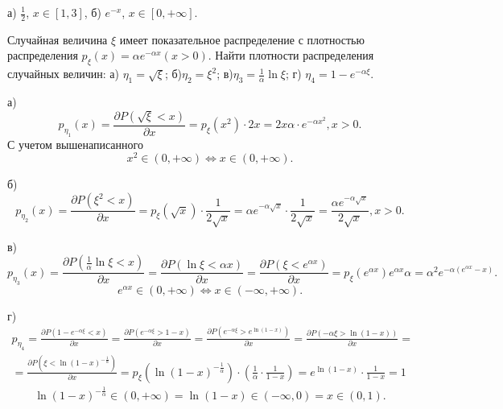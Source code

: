 \begin{solution}
  а) $\frac{1}{2}$, $x \in [1, 3]$, б) $e^{-x}$, $x \in [0, +\infty]$.
\end{solution}

\medskip
\begin{task}{3}
  Случайная величина $\xi$ имеет показательное распределение с плотностью распределения $p_\xi(x) = 
  \alpha e^{-\alpha x} (x > 0)$. Найти плотности распределения случайных величин: а) $\eta_1 = \sqrt{\xi}$;
  б)$\eta_2 = \xi^2$; в)$\eta_3 = \frac{1}{\alpha}\ln\xi$; г) $\eta_4 = 1 - e^{-\alpha\xi}$. 
\end{task}

\begin{subtask}{а)}
\[
p_{\eta_1}(x) = \frac{\partial P(\sqrt{\xi} < x)}{\partial x} = p_\xi(x^2) \cdot 2x = 
2x \alpha \cdot  e^{-\alpha x^2}, x > 0
.\] С учетом вышенаписанного 
\[
  x^2 \in (0, +\infty) \Longleftrightarrow x \in (0, +\infty)
.\] 
\end{subtask}

\begin{subtask}{б)}
\[
p_{\eta_2}(x) = \frac{\partial P(\xi^2 < x)}{\partial x} = p_\xi(\sqrt{x}) \cdot \frac{1}{2 \sqrt{x}
} = \alpha e^{-\alpha\sqrt{x} } \cdot  \frac{1}{2\sqrt{x} } = \frac{\alpha e^{-\alpha\sqrt{x}
}}{2\sqrt{x} }, x > 0
.\] 
\end{subtask}

\begin{subtask}{в)}
\[
  p_{\eta_3}(x) = \frac{\partial P(\frac{1}{\alpha}\ln\xi< x)}{\partial x} = \frac{\partial P(\ln\xi
  < \alpha x)}{\partial x} = \frac{\partial P(\xi < e^{\alpha x})}{\partial x} = p_\xi(e^{\alpha x})
  e^{\alpha x} \alpha = \alpha^2 e^{-\alpha(e^{\alpha x} - x)}
.\] 
\[
  e^{\alpha x} \in (0, +\infty) \Longleftrightarrow x \in (-\infty, +\infty)
.\] 
\end{subtask}

\begin{subtask}{г)}
\begin{align*}
p_{\eta_4} = \frac{\partial P(1 - e^{-\alpha \xi} < x)}{\partial x} = \frac{\partial P(e^{-\alpha\xi
}> 1 - x)}{\partial x} = \frac{\partial P(e^{-\alpha \xi} > e^{\ln(1 - x)})}{\partial x} = 
\frac{\partial P(-\alpha \xi > \ln(1 - x))}{\partial x} = \\ = \frac{\partial P(\xi < \ln(1 -
x)^{-\frac{1}{\alpha}})}{\partial x} = p_\xi(\ln(1 - x)^{- \frac{1}{\alpha}}) \cdot
(\frac{1}{\alpha} \cdot \frac{1}{1 - x}) = e^{\ln(1 - x)} \cdot  \frac{1}{1 - x} = 1
\end{align*}
\[
  \ln(1 - x)^{- \frac{1}{\alpha}} \in (0, + \infty) = \ln(1 - x) \in (-\infty, 0) = x \in (0, 1)
.\] 
\end{subtask}

